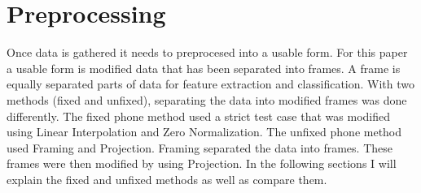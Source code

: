 \documentclass{sig-alternate}
\begin{document}
\section{Preprocessing} 
Once data is gathered it needs to preprocesed into a usable form. For this paper a usable form is modified data that has been separated into frames. A frame is equally separated parts of data for feature extraction and classification. With two methods (fixed and unfixed), separating the data into modified frames was done differently. The fixed phone method used a strict test case that was modified using Linear Interpolation and Zero Normalization. The unfixed phone method used Framing and Projection. Framing separated the data into frames. These frames were then modified by using Projection. In the following sections I will explain the fixed and unfixed methods as well as compare them. 
\end{document}
